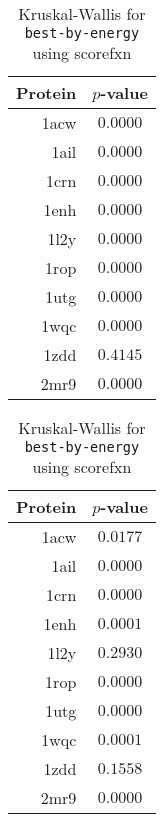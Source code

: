 \begin{table}
  \begin{minipage}{.5\linewidth}
  \centering
  \begin{tabular}{r|c}
  Protein & $p$-value \\ \hline \hline
  1acw & $\bm{0.0000}$ \\ \hline
  1ail & $\bm{0.0000}$ \\ \hline
  1crn & $\bm{0.0000}$ \\ \hline
  1enh & $\bm{0.0000}$ \\ \hline
  1l2y & $\bm{0.0000}$ \\ \hline
  1rop & $\bm{0.0000}$ \\ \hline
  1utg & $\bm{0.0000}$ \\ \hline
  1wqc & $\bm{0.0000}$ \\ \hline
  1zdd &     $0.4145$  \\ \hline
  2mr9 & $\bm{0.0000}$ \\ \hline
  \end{tabular}
  \caption{Kruskal-Wallis for \texttt{best-by-rmsd} using RMSD}
  \label{tab:kruskal-wallis-best-by-rmsd-RMSD}
  \end{minipage}
%
  \begin{minipage}{.5\linewidth}
  \centering
  \begin{tabular}{r|c}
  Protein & $p$-value \\ \hline \hline
  1acw & $\bm{0.0177}$ \\ \hline
  1ail & $\bm{0.0000}$ \\ \hline
  1crn & $\bm{0.0000}$ \\ \hline
  1enh & $\bm{0.0001}$ \\ \hline
  1l2y &     $0.2930$  \\ \hline
  1rop & $\bm{0.0000}$ \\ \hline
  1utg & $\bm{0.0000}$ \\ \hline
  1wqc & $\bm{0.0001}$ \\ \hline
  1zdd &     $0.1558$  \\ \hline
  2mr9 & $\bm{0.0000}$ \\ \hline
  \end{tabular}
  \caption{Kruskal-Wallis for \texttt{best-by-energy} using scorefxn}
  \label{tab:kruskal-wallis-best-by-energy-scorefxn}
  \end{minipage}
\end{table}